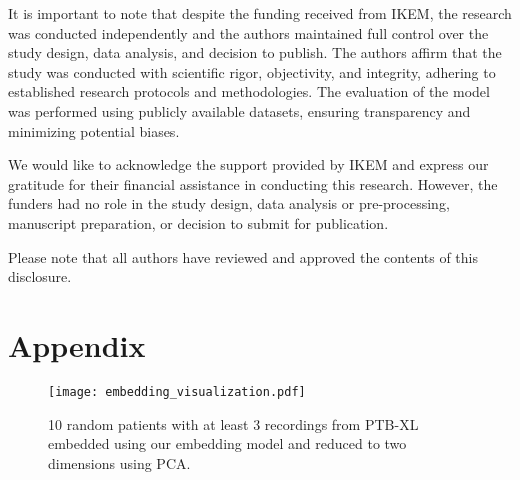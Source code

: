 \documentclass[preprint,12pt]{elsarticle}
\begin{document}
It is important to note that despite the funding received from IKEM, the research was conducted independently and the authors maintained full control over the study design, data analysis, and decision to publish. The authors affirm that the study was conducted with scientific rigor, objectivity, and integrity, adhering to established research protocols and methodologies. The evaluation of the model was performed using publicly available datasets, ensuring transparency and minimizing potential biases.

We would like to acknowledge the support provided by IKEM and express our gratitude for their financial assistance in conducting this research. However, the funders had no role in the study design, data analysis or pre-processing, manuscript preparation, or decision to submit for publication.

Please note that all authors have reviewed and approved the contents of this disclosure.

 

 
\clearpage
\appendix

\section{Appendix}

\begin{figure}[h]
    \centering
    \texttt{[image: embedding\_visualization.pdf]}
    \caption{10 random patients with at least 3 recordings from PTB-XL embedded using our embedding model and reduced to two dimensions using PCA.}
    \label{fig:pca-embeddings}
\end{figure}
\end{document}
